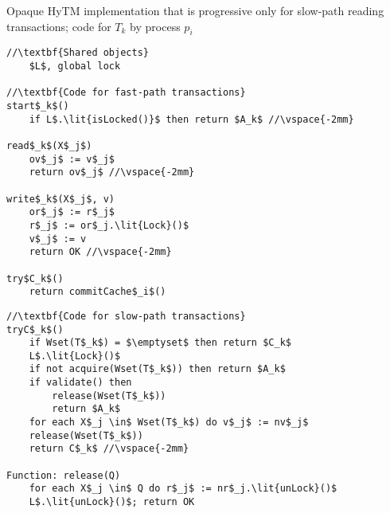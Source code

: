 \begin{algorithm*}[!t]
\caption{Opaque HyTM implementation that is progressive only for slow-path reading transactions; code for $T_k$ by process $p_i$}
\label{alg:inswrite2}
\vspace{-2mm}
\noindent\lstset{style=customc}
\begin{minipage}{0.49\textwidth}
\begin{lstlisting}[frame=none,firstnumber=1,mathescape=true]
//\textbf{Shared objects}
    $L$, global lock

//\textbf{Code for fast-path transactions}
start$_k$()
    if L$.\lit{isLocked()}$ then return $A_k$ //\vspace{-2mm}

read$_k$(X$_j$)
    ov$_j$ := v$_j$ 
    return ov$_j$ //\vspace{-2mm}

write$_k$(X$_j$, v)
    or$_j$ := r$_j$ 
    r$_j$ := or$_j.\lit{Lock}()$ 
    v$_j$ := v 
    return OK //\vspace{-2mm}

try$C_k$()
    return commitCache$_i$() 
\end{lstlisting}
\end{minipage}
\begin{minipage}{0.49\textwidth}
\begin{lstlisting}[frame=none,firstnumber=last,mathescape=true]
//\textbf{Code for slow-path transactions}
tryC$_k$()
    if Wset(T$_k$) = $\emptyset$ then return $C_k$
    L$.\lit{Lock}()$
    if not acquire(Wset(T$_k$)) then return $A_k$
    if validate() then
        release(Wset(T$_k$))
        return $A_k$
    for each X$_j \in$ Wset(T$_k$) do v$_j$ := nv$_j$
    release(Wset(T$_k$))
    return C$_k$ //\vspace{-2mm}
    
Function: release(Q)
    for each X$_j \in$ Q do r$_j$ := nr$_j.\lit{unLock}()$
    L$.\lit{unLock}()$; return OK
\end{lstlisting}
\end{minipage}
\vspace{-2mm}
\end{algorithm*}

